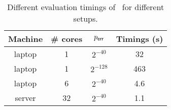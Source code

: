 \begin{table}[H]
\centering
\caption{Different evaluation timings of \hippo~for different setups.}
\label{tab:bonus}
\begin{tabular}{|c|c|c|c|}
\hline
Machine       &  \# cores    & $p_{\textsf{err}}$          & Timings (s) \\ \hline
laptop        &  1           & $2^{-40}$          &  32         \\ \hline
laptop        &  1           & $2^{-128}$         &  463        \\ \hline
laptop        &  6           & $2^{-40}$          &  4.6        \\ \hline
server        &  32         & $2^{-40}$          &  1.1       \\ \hline
\end{tabular}
\end{table}